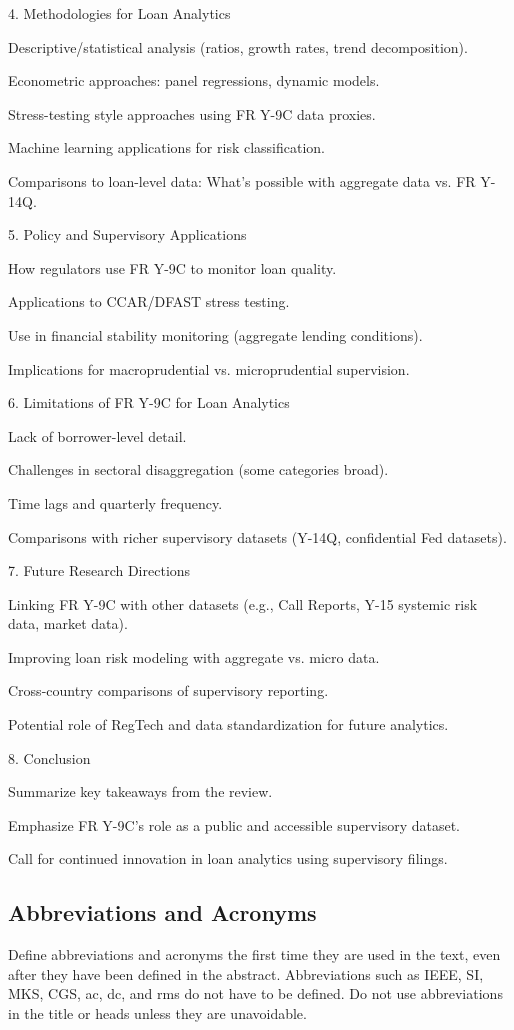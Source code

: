 \documentclass[conference]{IEEEtran}
\begin{document}
4. Methodologies for Loan Analytics

Descriptive/statistical analysis (ratios, growth rates, trend decomposition).

Econometric approaches: panel regressions, dynamic models.

Stress-testing style approaches using FR Y-9C data proxies.

Machine learning applications for risk classification.

Comparisons to loan-level data: What’s possible with aggregate data vs. FR Y-14Q.

5. Policy and Supervisory Applications

How regulators use FR Y-9C to monitor loan quality.

Applications to CCAR/DFAST stress testing.

Use in financial stability monitoring (aggregate lending conditions).

Implications for macroprudential vs. microprudential supervision.

6. Limitations of FR Y-9C for Loan Analytics

Lack of borrower-level detail.

Challenges in sectoral disaggregation (some categories broad).

Time lags and quarterly frequency.

Comparisons with richer supervisory datasets (Y-14Q, confidential Fed datasets).

7. Future Research Directions

Linking FR Y-9C with other datasets (e.g., Call Reports, Y-15 systemic risk data, market data).

Improving loan risk modeling with aggregate vs. micro data.

Cross-country comparisons of supervisory reporting.

Potential role of RegTech and data standardization for future analytics.

8. Conclusion

Summarize key takeaways from the review.

Emphasize FR Y-9C’s role as a public and accessible supervisory dataset.

Call for continued innovation in loan analytics using supervisory filings.
\subsection{Abbreviations and Acronyms}\label{AA}
Define abbreviations and acronyms the first time they are used in the text, 
even after they have been defined in the abstract. Abbreviations such as 
IEEE, SI, MKS, CGS, ac, dc, and rms do not have to be defined. Do not use 
abbreviations in the title or heads unless they are unavoidable.
\end{document}
